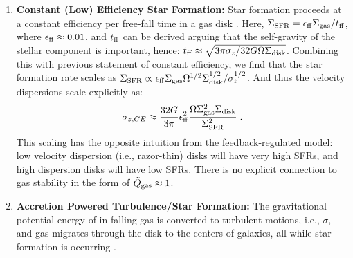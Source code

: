 \documentclass[usletter,fleqn,usenatbib]{mnras}
\newcommand{\be}{\begin{equation}}
\newcommand{\ee}{\end{equation}}
\begin{document}
\begin{enumerate}
\item \label{subsec:CEtheory} \textbf{Constant (Low) Efficiency Star Formation:}  
Star formation proceeds at a constant efficiency per free-fall time in a gas disk \citep[e.g.,][]{Krumholz2012, Salim2015}.  Here, $\Sigma_{\rm SFR} = \epsilon_{\rm ff} \Sigma_{\rm gas} / t_{\rm ff}$, where $\epsilon_{\rm ff} \approx 0.01$, and $t_{\rm ff}$ can be derived arguing that the self-gravity of the stellar component is important, hence: $t_{\rm ff} \approx \sqrt{{3 \pi \sigma_z}/{32 G \Omega \Sigma_{\rm disk}}}$.  Combining this with previous statement of constant efficiency, we find that the star formation rate scales as $\Sigma_{\rm SFR} \propto \epsilon_{\rm ff} \Sigma_{\rm gas}\Omega^{1/2} \Sigma_{\rm disk}^{1/2} /\sigma_z^{1/2}$. And thus the velocity dispersions scale explicitly as:
\be  \label{eq:sigmaCE}
\sigma_{z,CE} \approx \frac{32 G}{3 \pi} \epsilon_{\rm ff}^2 \frac{\Omega \Sigma_{\rm gas}^2 \Sigma_{\rm disk} }{\Sigma_{\rm SFR}^2}\; .
\ee 
This scaling has the opposite intuition from the feedback-regulated model: low velocity dispersion (i.e., razor-thin) disks will have very high SFRs, and high dispersion disks will have low SFRs.  There is no explicit connection to gas stability in the form of $\tilde Q_{\rm gas} \approx 1$.

\item \label{subsec:APtheory} \textbf{Accretion Powered Turbulence/Star Formation:}
The gravitational potential energy of in-falling gas is converted to turbulent motions, i.e., $\sigma$, and gas migrates through the disk to the centers of galaxies, all while star formation is occurring \citep{Klessen2010, Krumholz2010, Cacciato2012, Krumholz2018}.  


\end{enumerate}
\end{document}
